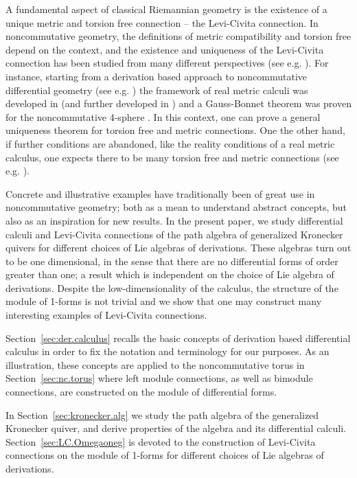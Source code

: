 \documentclass{amsart}
\theoremstyle{definition}
\theoremstyle{remark}
\numberwithin{equation}{section}
\begin{document}
A fundamental aspect of classical Riemannian geometry is the existence
of a unique metric and torsion free connection -- the Levi-Civita
connection. In noncommutative geometry, the definitions of metric
compatibility and torsion free depend on the context, and the existence
and uniqueness of the Levi-Civita connection has been studied from
many different perspectives (see
e.g. \cite{bm:starCompatibleConnections,r:leviCivita,ps:on.nc.lc.connections,al:projections.nc.cylinder,w:braided.cartan.calculi,a:levi-civita.class.nms}).
For instance, starting from a derivation based approach to
noncommutative differential geometry (see
e.g. \cite{dv:calculDifferentiel,dvm:connections.central.bimodules})
the framework of real metric calculi was developed in
\cite{aw:curvature.three.sphere} (and further developed in
\cite{atn:minimal.embeddings.morphisms}) and a Gauss-Bonnet theorem
was proven for the noncommutative 4-sphere \cite{aw:cgb.sphere}. In
this context, one can prove a general uniqueness theorem for torsion
free and metric connections. One the other hand, if further conditions
are abandoned, like the reality conditions of a real metric calculus,
one expects there to be many torsion free and metric connections (see
e.g. \cite{a:levi-civita.class.nms}).

Concrete and illustrative examples have traditionally been of great use in
noncommutative geometry; both as a mean to understand abstract
concepts, but also as an inspiration for new results. In the present
paper, we study differential calculi and Levi-Civita connections of
the path algebra of generalized Kronecker quivers for different
choices of Lie algebras of derivations. These algebras turn out to be
one dimensional, in the sense that there are no differential forms of
order greater than one; a result which is independent on the choice of
Lie algebra of derivations. Despite the low-dimensionality of the
calculus, the structure of the module of 1-forms is not trivial and we
show that one may construct many interesting examples of Levi-Civita
connections.

Section~\ref{sec:der.calculus} recalls the basic concepts of
derivation based differential calculus in order to fix the notation
and terminology for our purposes. As an illustration, these concepts
are applied to the noncommutative torus in Section~\ref{sec:nc.torus}
where left module connections, as well as bimodule connections, are
constructed on the module of differential forms.

In Section~\ref{sec:kronecker.alg} we study the path algebra of the
generalized Kronecker quiver, and derive properties of the algebra and
its differential calculi. Section~\ref{sec:LC.Omegaoneg} is devoted to
the construction of Levi-Civita connections on the module of 1-forms
for different choices of Lie algebras of derivations.
\end{document}
